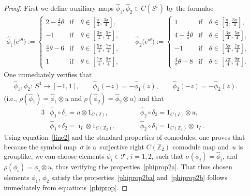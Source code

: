 \documentclass[pdftex]{sigma}
\begin{document}
\begin{proof}

First we def\/ine auxiliary maps $\hat\phi_1,\hat\phi_2\in C(S^1)$ by the formulae
\begin{gather}
\hat\phi_1\big(e^{i\theta}\big):=
\begin{cases}
2-\frac{4}{\pi}\theta & \text{if} \quad \theta\in[\frac{\pi}{4},\frac{3\pi}{4}],
\\
-1 & \text{if} \quad  \theta\in[\frac{3\pi}{4},\frac{5\pi}{4}],
\\
\frac{4}{\pi}\theta-6 &\text{if} \quad  \theta\in[\frac{5\pi}{4},\frac{7\pi}{4}],
\\
1 & \text{if} \quad  \theta\in[\frac{7\pi}{4},\frac{9\pi}{4}],
\end{cases}
\qquad
\hat\phi_2\big(e^{i\theta}\big):=
\begin{cases}
1 & \text{if} \quad \theta\in[\frac{\pi}{4},\frac{3\pi}{4}],
\\
4-\frac{4}{\pi}\theta & \text{if} \quad  \theta\in[\frac{3\pi}{4},\frac{5\pi}{4}],
\\
-1 &\text{if} \quad  \theta\in[\frac{5\pi}{4},\frac{7\pi}{4}],
\\
\frac{4}{\pi}\theta-8 &\text{if} \quad  \theta\in[\frac{7\pi}{4},\frac{9\pi}{4}].
\end{cases}
\label{phidefeq}
\end{gather}
One immediately verif\/ies that
\begin{gather}
\label{line2}
\hat\phi_1,\hat\phi_2: \ S^1\longrightarrow [-1,1],
\qquad
\hat\phi_1(-z)=-\hat\phi_1(z),
\qquad
\hat\phi_2(-z)=-\hat\phi_2(z).
\end{gather}
(i.e., $\rho(\hat\phi_1)=\hat\phi_1\otimes u$ and $\rho(\hat\phi_2)=\hat\phi_2\otimes u$) and that
\begin{alignat}{3}
& \hat\phi_1\circ\delta_1=u\otimes 1_{C(I)},
\qquad&&
\hat\phi_2\circ\delta_2=1_{C(I)}\otimes u,&
\nonumber
\\
&\hat\phi_1\circ\delta_2=\imath_I\otimes 1_{C({\mathbb Z_2})},
\qquad&&
\hat\phi_2\circ\delta_1=1_{C({\mathbb Z_2})}\otimes \imath_I.&
\label{phiprop}
\end{alignat}
Using equation~\eqref{line2} and the standard properties of comodules, one proves that because the symbol map~$\sigma$
is a~surjective right $C({\mathbb Z_2})$ comodule map and~$u$ is grouplike, we can choose elements
$\phi_i\in{\mathcal{T}}$, $i=1,2$, such that $\sigma(\phi_i)=\hat\phi_i$, and $\rho(\phi_i)=\phi_i\otimes u$, thus
verifying the properties~\eqref{phiprop2a}.
That thus chosen elements $\phi_1$, $\phi_2$ satisfy the properties~\eqref{phiprop2ba} and~\eqref{phiprop2b} follows
immediately from equations~\eqref{phiprop}.


\end{proof}
\end{document}
